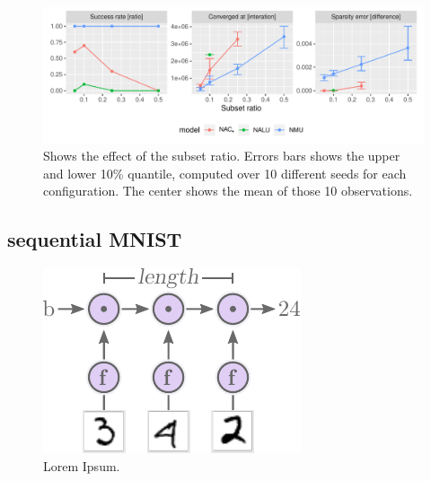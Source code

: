 \begin{figure}[H]
\centering
\includegraphics[width=\linewidth]{results/simple_function_static_subset.pdf}
\caption{Shows the effect of the subset ratio. Errors bars shows the upper and lower 10\% quantile, computed over 10 different seeds for each configuration. The center shows the mean of those 10 observations.}
\label{fig:simple-fnction-static-subset}
\end{figure}

\subsection{sequential MNIST}


\begin{figure}[H]
\centering
\includegraphics[scale=1]{graphics/mnist_sequence_problem.pdf}
\caption{Lorem Ipsum.}
\end{figure}

